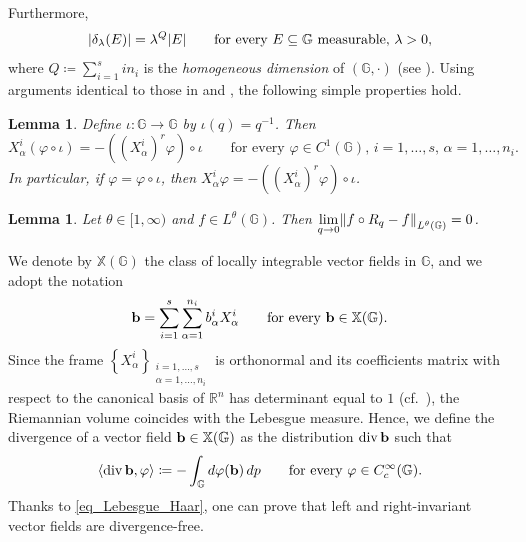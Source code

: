 \documentclass[11pt]{amsart}
\newcommand{\rr}{\mathbb R}
\newcommand{\bb}{{\bf {b}}} %
\DeclarePairedDelimiter{\abs}{\lvert}{\rvert}
\DeclarePairedDelimiter{\norm}{\lVert}{\rVert}
\DeclareMathOperator{\divv}{div}
\theoremstyle{plain}
\newtheorem{lemma}[theorem]{Lemma}
\theoremstyle{definition}
\theoremstyle{remark}
\numberwithin{equation}{section}
\begin{document}
Furthermore,
\begin{equation} \label{eq_dilation_Lebesgue}
\abs*{\delta_\lambda(E)}=\lambda^Q\abs*{E} \qquad \text{for every $E \subseteq\mathbb{G}$ measurable, $\lambda>0$,}
\end{equation}
where $Q \coloneqq \sum_{i=1}^s i n_i$ is the \emph{homogeneous dimension} of $(\mathbb{G},\cdot)$ (see \cite{MR3587666}). Using arguments identical to those in \cite[Lemma 2.1]{dpl1} and \cite[Lemma 2.2]{dpl1}, the following simple properties hold.
\begin{lemma}\label{lemscambiarederivateeinversione}
Define $\iota: \mathbb{G}\to\mathbb{G}$ by $\iota(q)=q^{-1}$. Then
\begin{equation*} 
X^i_\alpha(\varphi \circ \iota)=-\left(\left(X^i_\alpha \right)^r \varphi\right) \circ \iota \qquad \text{for every } \varphi \in C^1(\mathbb{G}),\, i=1,\ldots,s, \, \alpha=1,\ldots,n_i.
\end{equation*}
In particular, if $\varphi=\varphi\circ\iota$, then $X^i_\alpha\varphi=-\left(\left(X^i_\alpha \right)^r\varphi\right)\circ\iota$.
\end{lemma} 
\begin{lemma} \label{lem_continuity_translations}
Let $\theta \in [1,\infty)$ and $f \in L^\theta(\mathbb{G})$. Then $\displaystyle \lim_{q\to 0}\norm*{f \circ R_q - f}_{L^\theta(\mathbb{G})} =0$.
\end{lemma}
We denote by $\mathbb{X}(\mathbb{G})$ the class of locally integrable vector fields in $\mathbb{G}$, and we adopt the notation
\begin{equation} \label{eq_notation_vector_field}
\bb=\sum_{i=1}^s \sum_{\alpha=1}^{n_i} b^i_\alpha X^i_\alpha \qquad \text{for every $\bb \in \mathbb{X}(\mathbb{G})$.}    
\end{equation}
Since the frame $\left\{X^i_\alpha\right\}_{\substack{i=1,\dots,s \\ \alpha=1,\dots,n_i}}$ is orthonormal and its coefficients matrix with respect to the canonical basis of $\rr^n$ has determinant equal to $1$ (cf.~\cite[Corollary 1.3.19]{BonLanUgu}), the Riemannian volume coincides with the Lebesgue measure. Hence, we define the divergence of a vector field $\bb \in \mathbb{X}(\mathbb{G})$ as the distribution $\divv \bb$ such that
\begin{equation*}
\langle \divv \bb, \varphi \rangle \coloneqq -\int_{\mathbb{G}} d\varphi(\bb) \,dp \qquad \text{for every $\varphi \in C^\infty_c(\mathbb{G})$.}
\end{equation*}
Thanks to \eqref{eq_Lebesgue_Haar}, one can prove that left and right-invariant vector fields are divergence-free.
\end{document}
